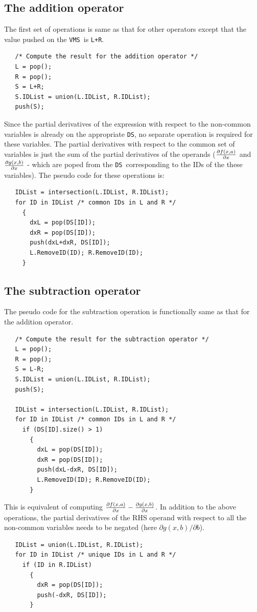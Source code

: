 \documentclass[acmtoms,acmnow]{acmtrans2m}
\newcommand{\DS}{{\tt DS}}
\newcommand{\VMS}{{\tt VMS}}
\begin{document}
%
\subsection{The addition operator}

The first set of operations is same as that for other operators except
that the value pushed on the \VMS\ is {\tt L+R}.
\begin{verbatim}
   /* Compute the result for the addition operator */
   L = pop();  
   R = pop();
   S = L+R;
   S.IDList = union(L.IDList, R.IDList);
   push(S);
\end{verbatim}
Since the partial derivatives of the expression with respect to the
non-common variables is already on the appropriate \DS, no separate
operation is required for these variables.  The partial derivatives
with respect to the common set of variables is just the sum of the
partial derivatives of the operands (${\partial f(x,a) \over {\partial
x}}$ and ${\partial g(x,b) \over {\partial x}}$ - which are poped from
the \DS\ corresponding to the IDs of the these variables).  The pseudo
code for these operations is:
\begin{verbatim}
   IDList = intersection(L.IDList, R.IDList);
   for ID in IDList /* common IDs in L and R */
     {
       dxL = pop(DS[ID]);
       dxR = pop(DS[ID]);
       push(dxL+dxR, DS[ID]);
       L.RemoveID(ID); R.RemoveID(ID);
     }
\end{verbatim}
%
%
\subsection{The subtraction operator}

The pseudo code for the subtraction operation is functionally same as
that for the addition operator.
\begin{verbatim}
   /* Compute the result for the subtraction operator */
   L = pop();  
   R = pop();
   S = L-R;
   S.IDList = union(L.IDList, R.IDList);
   push(S);

   IDList = intersection(L.IDList, R.IDList);
   for ID in IDList /* common IDs in L and R */
     if (DS[ID].size() > 1)
       {
         dxL = pop(DS[ID]);
         dxR = pop(DS[ID]);
         push(dxL-dxR, DS[ID]);
         L.RemoveID(ID); R.RemoveID(ID);
       }
\end{verbatim}
This is equivalent of computing ${\partial f(x,a) \over {\partial
    x}}-{\partial g(x,b) \over {\partial x}}$.  In addition to the
above operations, the partial derivatives of the RHS operand with
respect to all the non-common variables needs to be negated (here
$\partial g(x,b) / \partial b$).
\begin{verbatim}
   IDList = union(L.IDList, R.IDList);
   for ID in IDList /* unique IDs in L and R */
     if (ID in R.IDList)
       {
         dxR = pop(DS[ID]);
         push(-dxR, DS[ID]);
       }
\end{verbatim}
  
\end{document}
